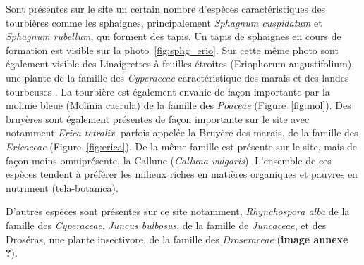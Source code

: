 Sont présentes sur le site un certain nombre d'espèces caractéristiques des tourbières comme les sphaignes, principalement \textit{Sphagnum cuspidatum} et \textit{Sphagnum rubellum}, qui forment des tapis.
Un tapis de sphaignes en cours de formation est visible sur la photo~\ref{fig:sphg_erio}.
Sur cette même photo sont également visible des Linaigrettes à feuilles étroites (Eriophorum augustifolium), une plante de la famille des \textit{Cyperaceae} caractéristique des marais et des landes tourbeuses \plop.
La tourbière est également envahie de façon importante par la molinie bleue (Molinia caerula) de la famille des \textit{Poaceae} (Figure~\ref{fig:mol}).
Des bruyères sont également présentes de façon importante sur le site avec notamment \textit{Erica tetralix}, parfois appelée la Bruyère des marais, de la famille des \textit{Ericaceae} (Figure~\ref{fig:erica}).
De la même famille est présente sur le site, mais de façon moins omniprésente, la Callune (\textit{Calluna vulgaris}).
L'ensemble de ces espèces tendent à préférer les milieux riches en matières organiques et pauvres en nutriment (tela-botanica).

D'autres espèces sont présentes sur ce site notamment, \textit{Rhynchospora alba} de la famille des \textit{Cyperaceae}, \textit{Juncus bulbosus}, de la famille de \textit{Juncaceae}, et des Droséras, une plante insectivore, de la famille des \textit{Droseraceae} (\textbf{image annexe ?}). 

